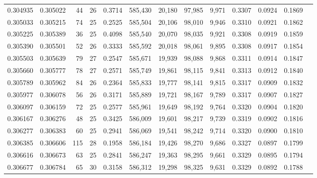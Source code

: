 \begin{tabular}{rrrrrrrrrrrrr}
0.304935 & 0.305022 &  44 &  26 &                                     0.3714 & 585,430 &  20,180 &  97,985 &   9,971 & 0.3307 & 0.0924 & 0.1869 \\
0.305033 & 0.305215 &  74 &  25 &                                     0.2525 & 585,504 &  20,106 &  98,010 &   9,946 & 0.3310 & 0.0921 & 0.1862 \\
0.305225 & 0.305389 &  36 &  25 &                                     0.4098 & 585,540 &  20,070 &  98,035 &   9,921 & 0.3308 & 0.0919 & 0.1859 \\
0.305390 & 0.305501 &  52 &  26 &                                     0.3333 & 585,592 &  20,018 &  98,061 &   9,895 & 0.3308 & 0.0917 & 0.1854 \\
0.305503 & 0.305639 &  79 &  27 &                                     0.2547 & 585,671 &  19,939 &  98,088 &   9,868 & 0.3311 & 0.0914 & 0.1847 \\
0.305660 & 0.305777 &  78 &  27 &                                     0.2571 & 585,749 &  19,861 &  98,115 &   9,841 & 0.3313 & 0.0912 & 0.1840 \\
0.305789 & 0.305962 &  84 &  26 &                                     0.2364 & 585,833 &  19,777 &  98,141 &   9,815 & 0.3317 & 0.0909 & 0.1832 \\
0.305977 & 0.306078 &  56 &  26 &                                     0.3171 & 585,889 &  19,721 &  98,167 &   9,789 & 0.3317 & 0.0907 & 0.1827 \\
0.306097 & 0.306159 &  72 &  25 &                                     0.2577 & 585,961 &  19,649 &  98,192 &   9,764 & 0.3320 & 0.0904 & 0.1820 \\
0.306167 & 0.306276 &  48 &  25 &                                     0.3425 & 586,009 &  19,601 &  98,217 &   9,739 & 0.3319 & 0.0902 & 0.1816 \\
0.306277 & 0.306383 &  60 &  25 &                                     0.2941 & 586,069 &  19,541 &  98,242 &   9,714 & 0.3320 & 0.0900 & 0.1810 \\
0.306385 & 0.306606 & 115 &  28 &                                     0.1958 & 586,184 &  19,426 &  98,270 &   9,686 & 0.3327 & 0.0897 & 0.1799 \\
0.306616 & 0.306673 &  63 &  25 &                                     0.2841 & 586,247 &  19,363 &  98,295 &   9,661 & 0.3329 & 0.0895 & 0.1794 \\
0.306677 & 0.306784 &  65 &  30 &                                     0.3158 & 586,312 &  19,298 &  98,325 &   9,631 & 0.3329 & 0.0892 & 0.1788 \\

\end{tabular}
